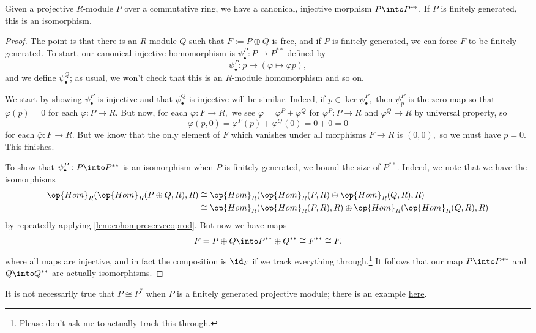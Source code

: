 \documentclass[../notes.tex]{subfiles}
\begin{document}
\begin{proposition}
	Given a projective $R$-module $P$ over a commutative ring, we have a canonical, injective morphism $P\into P^{**}.$ If $P$ is finitely generated, this is an isomorphism.
\end{proposition}
\begin{proof}
	The point is that there is an $R$-module $Q$ such that $F:=P\oplus Q$ is free, and if $P$ is finitely generated, we can force $F$ to be finitely generated. To start, our canonical injective homomorphism is $\psi^P_\bullet:P\to P^{**}$ defined by
	\[\psi^P_\bullet:p\mapsto(\varphi\mapsto\varphi p),\]
	and we define $\psi^Q_\bullet$; as usual, we won't check that this is an $R$-module homomorphism and so on.
	
	We start by showing $\psi^P_\bullet$ is injective and that $\psi^Q_\bullet$ is injective will be similar. Indeed, if $p\in\ker\psi^P_\bullet,$ then $\psi^P_p$ is the zero map so that $\varphi(p)=0$ for each $\varphi:P\to R.$ But now, for each $\overline{\varphi}:F\to R,$ we see $\overline\varphi=\varphi^P+\varphi^Q$ for $\varphi^P:P\to R$ and $\varphi^Q\to R$ by universal property, so
	\[\overline\varphi(p,0)=\varphi^P(p)+\varphi^Q(0)=0+0=0\]
	for each $\overline\varphi:F\to R.$ But we know that the only element of $F$ which vanishes under all morphisms $F\to R$ is $(0,0),$ so we must have $p=0.$ This finishes.
	
	To show that $\psi^P_\bullet:P\into P^{**}$ is an isomorphism when $P$ is finitely generated, we bound the size of $P^{**}.$ Indeed, we note that we have the isomorphisms
	\begin{align*}
		\op{Hom}_R(\op{Hom}_R(P\oplus Q,R),R) &\cong \op{Hom}_R(\op{Hom}_R(P,R)\oplus\op{Hom}_R(Q,R),R) \\
		&\cong\op{Hom}_R(\op{Hom}_R(P,R),R)\oplus\op{Hom}_R(\op{Hom}_R(Q,R),R)
	\end{align*}
	by repeatedly applying \autoref{lem:cohompreservecoprod}. But now we have maps
	\[F=P\oplus Q\into P^{**}\oplus Q^{**}\cong F^{**}\cong F,\]
	where all maps are injective, and in fact the composition is $\id_F$ if we track everything through.\footnote{Please don't ask me to actually track this through.} It follows that our map $P\into P^{**}$ and $Q\into Q^{**}$ are actually isomorphisms.
\end{proof}
\begin{remark}
	It is not necessarily true that $P\cong P^*$ when $P$ is a finitely generated projective module; there is an example \href{https://math.stackexchange.com/a/1343962/869257}{here}.
\end{remark}
\end{document}
